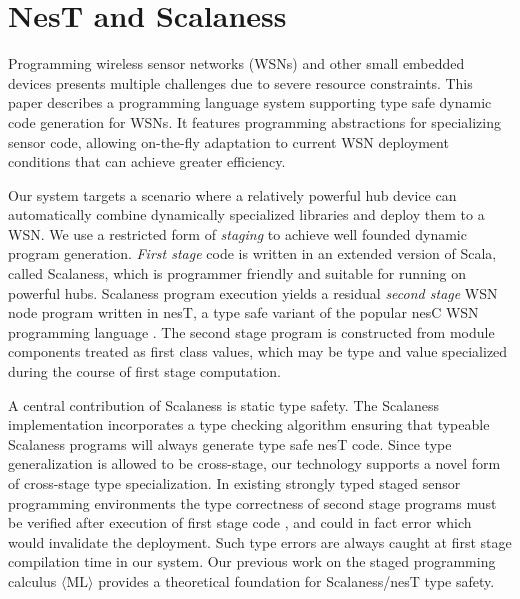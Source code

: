 
\chapter{NesT and Scalaness}
\label{chapter-nest-scalaness}


Programming wireless sensor networks (WSNs) and other small embedded
devices presents multiple challenges due to severe resource
constraints.  This paper describes a programming language system
supporting type safe dynamic code generation for WSNs. It features
programming abstractions for specializing sensor code, allowing
on-the-fly adaptation to current WSN deployment conditions that can achieve greater
efficiency. %

Our system targets a scenario where a relatively powerful hub device
can automatically combine dynamically specialized libraries and deploy
them to a WSN. We use a restricted form of \emph{staging}
\cite{Taha-MetaML,DBLP:conf/icess/Taha04,289140} to achieve
well founded dynamic program generation.  \emph{First stage} code is
written in an extended version of Scala, called Scalaness, which is
programmer friendly and suitable for running on powerful hubs.
Scalaness program execution yields a residual \emph{second stage} WSN
node program written in nesT, a type safe variant of the popular nesC
WSN programming language \cite{Gay-nesC-2003}.  The second stage
program is constructed from module components treated as first class
values, which may be type and value specialized during the course of
first stage computation.

A central contribution of Scalaness is static type safety. The
Scalaness implementation incorporates a type checking algorithm
ensuring that typeable Scalaness programs will always generate type
safe nesT code.  Since type generalization is allowed to be
cross-stage, our technology supports a novel form of cross-stage type
specialization.  In existing strongly typed staged sensor programming
environments the type correctness of second stage programs must be
verified after execution of first stage code
\cite{Mainland-Flask-2008}, and could in fact error which would
invalidate the deployment.  Such type errors are always caught at
first stage compilation time in our system.  Our previous work on the
staged programming calculus $\langle \text{ML} \rangle$
\cite{FramedML} provides a theoretical foundation for Scalaness/nesT
type safety.

